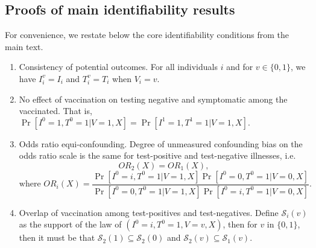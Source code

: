 
\begin{appendix}

    \renewcommand{\thefigure}{A\arabic{figure}}
    \setcounter{figure}{0}
    
    \renewcommand{\thetable}{A\arabic{table}}
    \setcounter{table}{0}
    
    \renewcommand{\theequation}{A\arabic{equation}}
    \setcounter{equation}{0}

    \singlespacing
    \newpage

    \section{Proofs of main identifiability results} \label{sec:proofs}
    For convenience, we restate below the core identifiability conditions from the main text. 
    \begin{enumerate}[label=\upshape(A\arabic*), ref=A\arabic*]
    \item\label{app_ass1} Consistency of potential outcomes. For all individuals $i$ and for $v \in \{0, 1\}$, we have $I_i^v = I_i$ and $T_i^v = T_i$ when $V_i = v$. 
    \item\label{app_ass2} No effect of vaccination on testing negative and symptomatic among the vaccinated. That is, $\Pr[I^0 = 1, T^0=1 | V = 1, X] = \Pr[I^1 = 1, T^1=1 | V = 1, X].$
    \item\label{app_ass3} Odds ratio equi-confounding. Degree of unmeasured confounding bias on the odds ratio scale is the same for test-positive and test-negative illnesses, i.e. 
    $$OR_2(X) = OR_1(X), $$
    $$ \text{where } OR_i(X) = \frac{\Pr[I^0 = i, T^0 = 1 | V = 1, X]\Pr[I^0 = 0, T^0 = 1 | V = 0, X]}{\Pr[I^0 = 0, T^0 = 1 | V = 1, X]\Pr[I^0 = i, T^0 = 1| V = 0, X]}.$$
    \item\label{app_ass4} Overlap of vaccination among test-positives and test-negatives. Define $\mathcal{S}_i(v)$ as the support of the law of $(I^0 = i, T^0 = 1, V = v, X)$, then for $v$ in $\{0,1\}$, then it must be that $\mathcal{S}_2(1) \subseteq \mathcal{S}_2(0)$ and $\mathcal{S}_2(v) \subseteq \mathcal{S}_1(v).$
\end{enumerate}


\end{appendix}

